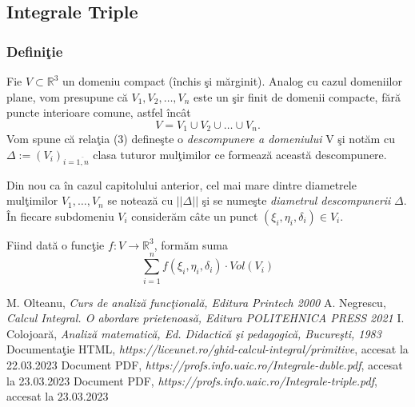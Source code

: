 \documentclass{article}
\begin{document}
\subsection{Integrale Triple}
\subsubsection{Defini\c tie}
Fie $V \subset \mathbb{R}^3$ un domeniu compact (\^ inchis \c si m\u arginit).\cite{text6} Analog cu cazul domeniilor plane, vom presupune c\u a $V_1, V_2, \dots , V_n$ este un \c sir finit de domenii compacte, f\u ar\u a puncte interioare comune, astfel \^ inc\^ at
\begin{equation}
V = V_1 \cup V_2 \cup \dots \cup V_n.
\end{equation}
Vom spune c\u a rela\c tia (3) define\c ste o \emph {descompunere a domeniului} V \c si not\u am cu $\Delta := {(V_i)}_{i=\overline{1,n}}$ clasa tuturor mul\c timilor ce formeaz\u a aceast\u a descompunere. \par
Din nou ca \^ in cazul capitolului anterior, cel mai mare dintre diametrele mul\c timilor  $V_1, \dots , V_n$ se noteaz\u a cu $ ||\Delta||$ \c si se nume\c ste \emph {diametrul descompunerii} $\Delta$. \^ In fiecare subdomeniu $V_i$ consider\u am c\^ate un punct  $({\xi}_i, {\eta}_i, {\delta}_i) \in  V_i.$ \par
Fiind dat\u a o func\c tie $f : V \to \mathbb{R}^3$, form\u am suma
\begin{equation}
\sum_{i = 1}^n f({\xi}_i, {\eta}_i, {\delta}_i) \cdot Vol(V_i)
\end{equation}

\newpage
\begin{thebibliography}{99}
  M. Olteanu, \emph {Curs de analiz\u a func\c tional\u a, Editura Printech 2000}
  A. Negrescu, \emph {Calcul Integral. O abordare prietenoas\u a, Editura POLITEHNICA PRESS 2021}
  I. Colojoar\u a, \emph {Analiz\u a matematic\u a, Ed. Didactic\u a \c si pedagogic\u a, Bucure\c sti, 1983}
 Documenta\c tie HTML, \emph {https://liceunet.ro/ghid-calcul-integral/primitive}, accesat la 22.03.2023
 Document PDF, \emph {https://profs.info.uaic.ro/Integrale-duble.pdf}, accesat la 23.03.2023
  Document PDF, \emph {https://profs.info.uaic.ro/Integrale-triple.pdf}, accesat la 23.03.2023
\end{thebibliography}
\end{document}

